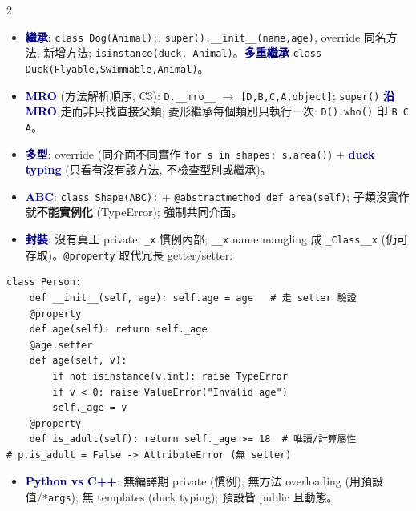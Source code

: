 \documentclass[12pt]{extarticle}
\newcommand{\py}{\lstinline[language={},basicstyle=\ttfamily\fontsize{10.5}{13}\selectfont\bfseries,backgroundcolor=\color{white}]}
\newcommand{\sub}[1]{\textcolor{navy}{\textbf{#1}}}
\newcommand{\warn}[1]{\textcolor{warn}{\textbf{#1}}}
\newcommand{\ra}{$\rightarrow$}
\newenvironment{bl}{\begin{itemize}[leftmargin=10pt,itemsep=1pt,parsep=0pt,topsep=1pt,partopsep=0pt,labelsep=3pt,label={\textbullet}]}{\end{itemize}}
\begin{document}
\begin{multicols*}{2}
\begin{bl}
\item \sub{繼承}: \py|class Dog(Animal):|, \py|super().__init__(name,age)|, override 同名方法, 新增方法; \py|isinstance(duck, Animal)|。\sub{多重繼承} \py|class Duck(Flyable,Swimmable,Animal)|。
\item \sub{MRO} (方法解析順序, C3): \py|D.__mro__| \ra{} \py|[D,B,C,A,object]|; \py|super()| \sub{沿 MRO} 走而非只找直接父類; 菱形繼承每個類別只執行一次: \py|D().who()| 印 \py|B C A|。
\item \sub{多型}: override (同介面不同實作 \py|for s in shapes: s.area()|) + \sub{duck typing} (只看有沒有該方法, 不檢查型別或繼承)。
\item \sub{ABC}: \py|class Shape(ABC):| + \py|@abstractmethod def area(self)|; 子類沒實作就\warn{不能實例化} (TypeError); 強制共同介面。
\item \sub{封裝}: 沒有真正 private; \py|_x| 慣例內部; \py|__x| name mangling 成 \py|_Class__x| (仍可存取)。\py|@property| 取代冗長 getter/setter:
\end{bl}
\begin{lstlisting}
class Person:
    def __init__(self, age): self.age = age   # 走 setter 驗證
    @property
    def age(self): return self._age
    @age.setter
    def age(self, v):
        if not isinstance(v,int): raise TypeError
        if v < 0: raise ValueError("Invalid age")
        self._age = v
    @property
    def is_adult(self): return self._age >= 18  # 唯讀/計算屬性
# p.is_adult = False -> AttributeError (無 setter)
\end{lstlisting}
\begin{bl}
\item \sub{Python vs C++}: 無編譯期 private (慣例); 無方法 overloading (用預設值/\py|*args|); 無 templates (duck typing); 預設皆 public 且動態。
\end{bl}


\end{multicols*}
\end{document}
